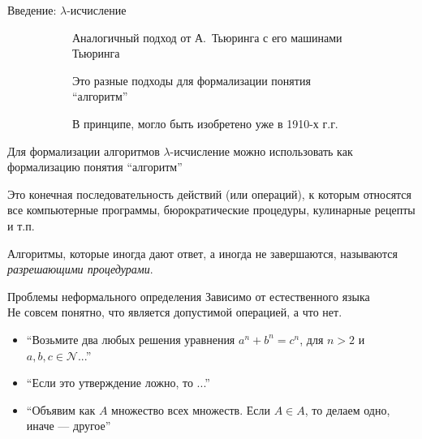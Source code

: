 \begin{frame}{Введение: $\lambda$-исчисление}
\begin{figure}
\begin{subfigure}[t]{0.45\textwidth}
Аналогичный подход от А.~Тьюринга с его машинами Тьюринга
\vspace{1em}

Это разные подходы для формализации понятия \enquote{алгоритм}
\vspace{1em}

В принципе, могло быть изобретено уже в 1910-х г.г.

    \end{subfigure}
  \end{figure}
\end{frame}

\begin{frame}{Для формализации алгоритмов}
$\lambda$-исчисление можно использовать как формализацию понятия \enquote{алгоритм}

\begin{definition}
Это конечная последовательность действий (или операций), к которым относятся все компьютерные программы, бюрократические процедуры, кулинарные рецепты и т.п.
\end{definition}

Алгоритмы, которые иногда дают ответ, а иногда не завершаются, называются \textit{разрешающими процедурами}.
\end{frame}

\begin{frame}{Проблемы неформального определения}
Зависимо от естественного языка\\


\vspace{1em}
Не совсем понятно, что является допустимой операцией, а что нет.
\begin{itemize}
    \item \enquote{Возьмите два любых решения уравнения $a^n+b^n=c^n$, для $n>2$ и $a,b,c\in \mathcal{N}$...}
	\item \enquote{Если это утверждение ложно, то ...}
	\item \enquote{Объявим как $A$ множество всех множеств. Если $A\in A$, то делаем одно, иначе --- другое}
\end{itemize}
\end{frame}


